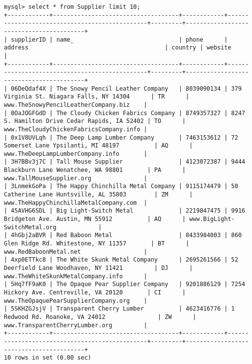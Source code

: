 \documentclass[american,extrafontsizes,12pt,portrait,letterpaper,oneside,onecolumn,article,final]{memoir}
\begin{document}
\begin{verbatim}
mysql> select * from Supplier limit 10;
+------------+------------------------------------+------------+-----------------------------------------------+---------+-----------------------------------------+
| supplierID | name_                              | phone      | address                                       | country | website                                 |
+------------+------------------------------------+------------+-----------------------------------------------+---------+-----------------------------------------+
| 06DeQdaf4X | The Snowy Pencil Leather Company   | 8039090134 | 379 Virginia St. Niagara Falls, NY 14304      | TR      | www.TheSnowyPencilLeatherCompany.biz    |
| 0OaJOGFGdD | The Cloudy Chicken Fabrics Company | 8749357327 | 8247 S. Hamilton Drive Cedar Rapids, IA 52402 | TO      | www.TheCloudyChickenFabricsCompany.info |
| 0x1V8UVLqh | The Deep Lamp Lumber Company       | 7463153612 | 72 Somerset Lane Ypsilanti, MI 48197          | AQ      | www.TheDeepLampLumberCompany.info       |
| 3H7BBv3j7C | Tall Mouse Supplier                | 4123072387 | 9444 Blackburn Lane Wenatchee, WA 98801       | PA      | www.TallMouseSupplier.org               |
| 3LnmekGoPa | The Happy Chinchilla Metal Company | 9115174479 | 50 Catherine Lane Huntsville, AL 35803        | ZM      | www.TheHappyChinchillaMetalCompany.com  |
| 45AVHG6SDL | Big Light-Switch Metal             | 2219847475 | 9916 Bridgeton Ave. Austin, MN 55912          | AQ      | www.BigLight-SwitchMetal.org            |
| 4hGbj2aBVR | Red Baboon Metal                   | 8433984003 | 860 Glen Ridge Rd. Whitestone, NY 11357       | BT      | www.RedBaboonMetal.net                  |
| 4xp0ETTkc8 | The White Skunk Metal Company      | 2695261566 | 52 Deerfield Lane Woodhaven, NY 11421         | DJ      | www.TheWhiteSkunkMetalCompany.info      |
| 5Hq7fF9aK0 | The Opaque Pear Supplier Company   | 9201886129 | 7254 Hickory Ave. Centreville, VA 20120       | CI      | www.TheOpaquePearSupplierCompany.org    |
| 5SKHZGJsjV | Transparent Cherry Lumber          | 4623416776 | 1 Redwood Rd. Roanoke, VA 24012               | ZW      | www.TransparentCherryLumber.org         |
+------------+------------------------------------+------------+-----------------------------------------------+---------+-----------------------------------------+
10 rows in set (0.00 sec)


\end{verbatim}
\end{document}

